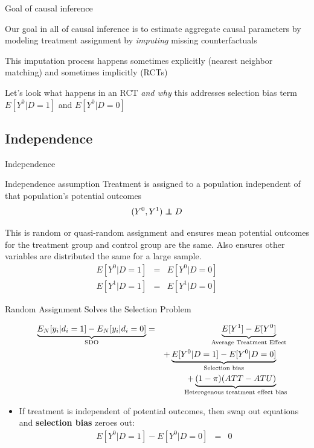 \documentclass{beamer}
\newcommand\independent{\protect\mathpalette{\protect\independenT}{\perp}}
\def\independenT#1#2{\mathrel{\rlap{$#1#2$}\mkern2mu{#1#2}}}
\begin{document}
\begin{frame}{Goal of causal inference}

  Our goal in all of causal inference is to estimate aggregate causal parameters by modeling treatment assignment by \emph{imputing} missing counterfactuals

  \bigskip

This imputation process happens sometimes explicitly (nearest neighbor matching) and sometimes implicitly (RCTs)

  \bigskip

  Let's look what happens in an RCT \emph{and why} this addresses selection bias term $E[Y^0|D=1]$ and $E[Y^0|D=0]$

\end{frame}



\subsection{Independence}


\begin{frame}{Independence}


  \begin{block}{Independence assumption}
    Treatment is assigned to a population independent of that population's potential outcomes  $$(Y^0,Y^1)\independent{D}$$
  \end{block}
  This is random or quasi-random assignment and ensures mean potential outcomes for the treatment group and control group are the same.  Also ensures other variables are distributed the same for a large sample.
  \begin{eqnarray*}
    E[Y^0|D=1] &=& E[Y^0 | D=0] \\
    E[Y^1|D=1] &=& E[Y^1 | D=0]
  \end{eqnarray*}
\end{frame}

\begin{frame}{Random Assignment Solves the Selection Problem}

  \begin{eqnarray*}
    \underbrace{E_N[y_i | d_i=1] - E_N[y_i | d_i=0]}_{ \mathclap{\text{SDO}}}&=& \underbrace{E[Y^1] - E[Y^0]}_{ \mathclap{\text{Average Treatment Effect}}} \\
    &&+ \underbrace{E[Y^0|D=1] - E[Y^0 | D=0]}_{ \mathclap{\text{Selection bias}}}  \\
    && + \underbrace{(1-\pi)(ATT - ATU)}_{ \mathclap{\text{Heterogenous treatment effect bias}}}
  \end{eqnarray*}


  \begin{itemize}
    \item If treatment is independent of potential outcomes, then swap out equations and \textbf{selection bias} zeroes out:
          \begin{eqnarray*}
            E[Y^0 | D=1] - E[Y^0 | D=0] &=& 0
          \end{eqnarray*}
  \end{itemize}

\end{frame}
\end{document}
